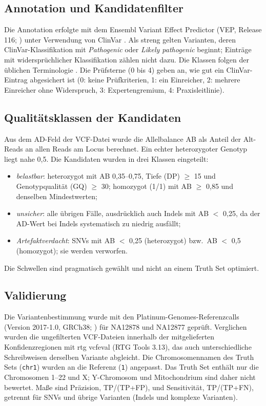 \documentclass[10pt,a4paper,twocolumn]{article}
\begin{document}
\subsection{Annotation und Kandidatenfilter}
Die Annotation erfolgte mit dem Ensembl Variant Effect Predictor (VEP, Release 116; \citealp{mclaren2016}) unter Verwendung von ClinVar \citep{landrum2018}. Als streng gelten Varianten, deren ClinVar-Klassifikation mit \emph{Pathogenic} oder \emph{Likely pathogenic} beginnt; Eintr\"age mit widerspr\"uchlicher Klassifikation z\"ahlen nicht dazu. Die Klassen folgen der \"ublichen Terminologie \citep{richards2015}. Die Pr\"ufsterne (0 bis 4) geben an, wie gut ein ClinVar-Eintrag abgesichert ist (0: keine Pr\"ufkriterien, 1: ein Einreicher, 2: mehrere Einreicher ohne Widerspruch, 3: Expertengremium, 4: Praxisleitlinie).

\subsection{Qualit\"atsklassen der Kandidaten}
Aus dem AD-Feld der VCF-Datei wurde die Allelbalance AB als Anteil der Alt-Reads an allen Reads am Locus berechnet. Ein echter heterozygoter Genotyp liegt nahe 0,5. Die Kandidaten wurden in drei Klassen eingeteilt:
\begin{itemize}
\item \emph{belastbar}: heterozygot mit AB 0,35--0,75, Tiefe (DP) $\geq$ 15 und Genotypqualit\"at (GQ) $\geq$ 30; homozygot (1/1) mit AB $\geq$ 0,85 und denselben Mindestwerten;
\item \emph{unsicher}: alle \"ubrigen F\"alle, ausdr\"ucklich auch Indels mit AB $<$ 0,25, da der AD-Wert bei Indels systematisch zu niedrig ausf\"allt;
\item \emph{Artefaktverdacht}: SNVs mit AB $<$ 0,25 (heterozygot) bzw.\ AB $<$ 0,5 (homozygot); sie werden verworfen.
\end{itemize}
Die Schwellen sind pragmatisch gew\"ahlt und nicht an einem Truth Set optimiert.

\subsection{Validierung}
Die Variantenbestimmung wurde mit den Platinum-Genomes-Referenzcalls (Version 2017-1.0, GRCh38; \citealp{eberle2017}) f\"ur NA12878 und NA12877 gepr\"uft. Verglichen wurden die ungefilterten VCF-Dateien innerhalb der mitgelieferten Konfidenzregionen mit rtg vcfeval (RTG Tools 3.13), das auch unterschiedliche Schreibweisen derselben Variante abgleicht. Die Chromosomennamen des Truth Sets (\texttt{chr1}) wurden an die Referenz (\texttt{1}) angepasst. Das Truth Set enth\"alt nur die Chromosomen 1--22 und X; Y-Chromosom und Mitochondrium sind daher nicht bewertet. Ma\ss e sind Pr\"azision, TP/(TP+FP), und Sensitivit\"at, TP/(TP+FN), getrennt f\"ur SNVs und \"ubrige Varianten (Indels und komplexe Varianten).
\end{document}
